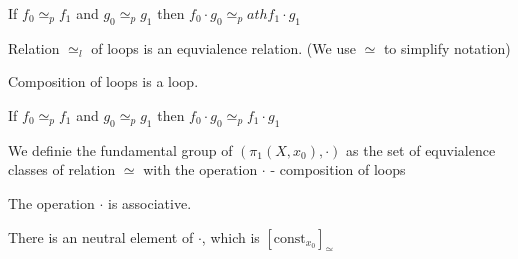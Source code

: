     \begin{lemma}
        \label{lem:path_comp_homoclass}

        If $f_0 \simeq_p f_1$ and $g_0 \simeq_p g_1$ then $f_0 \cdot g_0 \simeq_path f_1 \cdot g_1$ 
    \end{lemma}

    \begin{theorem}
        \label{thm:loop_homotopy_equiv}

        Relation $\simeq_l$ of loops is an equvialence relation. (We use $\simeq$ to simplify notation)
    \end{theorem}

    \begin{lemma}
        \label{lem:loop_comp_loop}
        
        Composition of loops is a loop.
    \end{lemma}

    \begin{lemma}
        \label{lem:loop_comp_homoclass}

        If $f_0 \simeq_p f_1$ and $g_0 \simeq_p g_1$ then $f_0 \cdot g_0 \simeq_p f_1 \cdot g_1$ 
    \end{lemma}

    \begin{definition}
        \label{def:fundamental_group}

        We definie the fundamental group of $(\pi_1(X, x_0),\cdot)$ as the set of equvialence classes of relation $\simeq$ with 
        the operation $\cdot$ - composition of loops
    \end{definition}

    \begin{lemma}
        \label{lem:loop_comp_assoc}

        The operation $\cdot$ is associative.
    \end{lemma}

    \begin{lemma}
        \label{lem:loop_comp_neutral}
        
        There is an neutral element of $\cdot$, which is $[\text{const}_{x_0}]_{\simeq}$
    \end{lemma}

